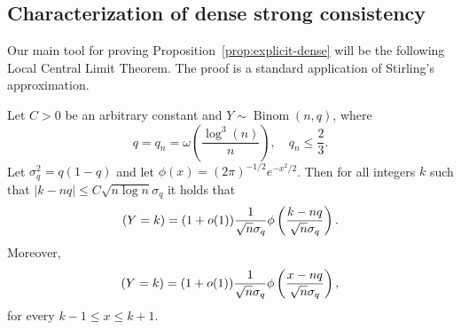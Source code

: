 \documentclass[EJP,final]{ejpecp}
\newcommand{\1}[1]{\mathbbm{1}_{\{#1\}}}
\let\Pr\relax
\DeclareMathOperator{\Pr}{Pr}
\DeclareMathOperator{\Binom}{Binom}
\begin{document}
\subsection{Characterization of dense strong consistency}
Our main tool for proving Proposition~\ref{prop:explicit-dense}
will be the following Local Central Limit Theorem. The proof is a standard
application of Stirling's approximation.
\begin{lemma}\label{lem:lclt}
Let $C > 0$ be an arbitrary constant and $Y \sim \Binom(n,q)$, where
\[
q = q_n = \omega\left(\frac{\log^3(n)}{n}\right), \quad q_n \leq \frac 23.
\]
Let $\sigma_q^2 = q(1-q)$ and let $\phi(x) = (2\pi)^{-1/2} e^{-x^2/2}$.
 Then for all integers $k$ such that $|k-nq| \leq C \sqrt{n \log n} \sigma_q$ it holds that
\[
\Pr(Y = k) = (1+o(1)) \frac{1}{\sqrt n \sigma_q}
\phi \left( \frac{k-nq}{\sqrt{n} \sigma_q} \right).
\]
Moreover,
\[
\Pr(Y = k) = (1+o(1)) \frac{1}{\sqrt n \sigma_q}
\phi \left( \frac{x-nq}{\sqrt{n} \sigma_q} \right),
\]
for every $k-1 \leq x \leq k+1$.
\end{lemma}
\end{document}
